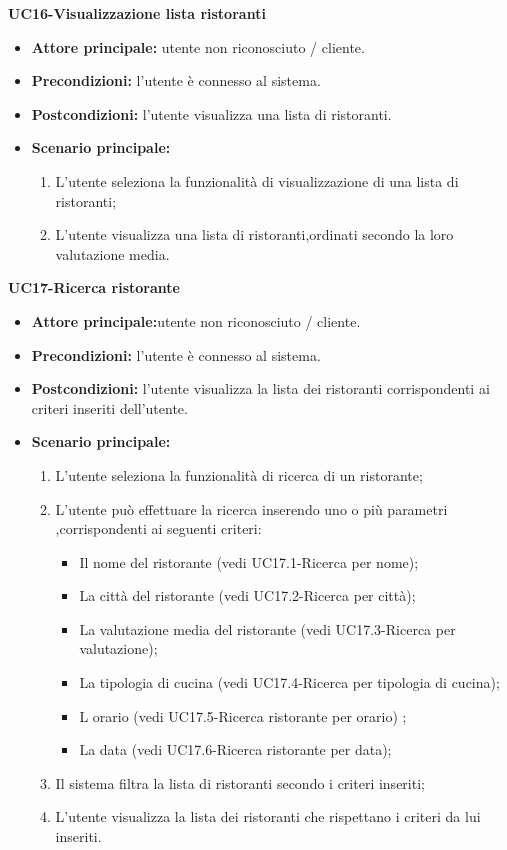 \textbf{UC16-Visualizzazione lista ristoranti}
\begin{itemize}
\item \textbf{Attore principale:} utente non riconosciuto / cliente.
\item \textbf{Precondizioni:} l'utente è connesso al sistema.
\item \textbf{Postcondizioni:} l'utente visualizza una lista di ristoranti.
\item \textbf{Scenario principale:}
\begin{enumerate}
    \item L'utente seleziona la funzionalità di visualizzazione di una lista di ristoranti;
    \item L'utente visualizza una lista di ristoranti,ordinati secondo la loro valutazione media.
\end{enumerate}
\end{itemize}

\textbf{UC17-Ricerca ristorante}
\begin{itemize}
\item \textbf{Attore principale:}utente non riconosciuto / cliente.
\item \textbf{Precondizioni:} l'utente è connesso al sistema.
\item \textbf{Postcondizioni:} l'utente visualizza la lista dei ristoranti corrispondenti ai criteri inseriti
dell'utente.
\item \textbf{Scenario principale:}
\begin{enumerate}
    \item L'utente seleziona la funzionalità di ricerca di un ristorante;
    \item L'utente può effettuare la ricerca inserendo uno o più parametri ,corrispondenti
    ai seguenti criteri:
    \begin{itemize}
        \item Il nome del ristorante (vedi UC17.1-Ricerca per nome);
        \item La città del ristorante (vedi UC17.2-Ricerca per città);
        \item La valutazione media del ristorante (vedi UC17.3-Ricerca per valutazione);
        \item La tipologia di cucina (vedi UC17.4-Ricerca per tipologia di cucina);
        \item L orario (vedi UC17.5-Ricerca ristorante per orario) ;
        \item La data (vedi UC17.6-Ricerca ristorante per data); 
    \end{itemize}
    \item  Il sistema filtra la lista di ristoranti secondo i criteri inseriti;
    \item L'utente visualizza la lista dei ristoranti che rispettano i criteri da lui inseriti.
\end{enumerate}
\end{itemize}

